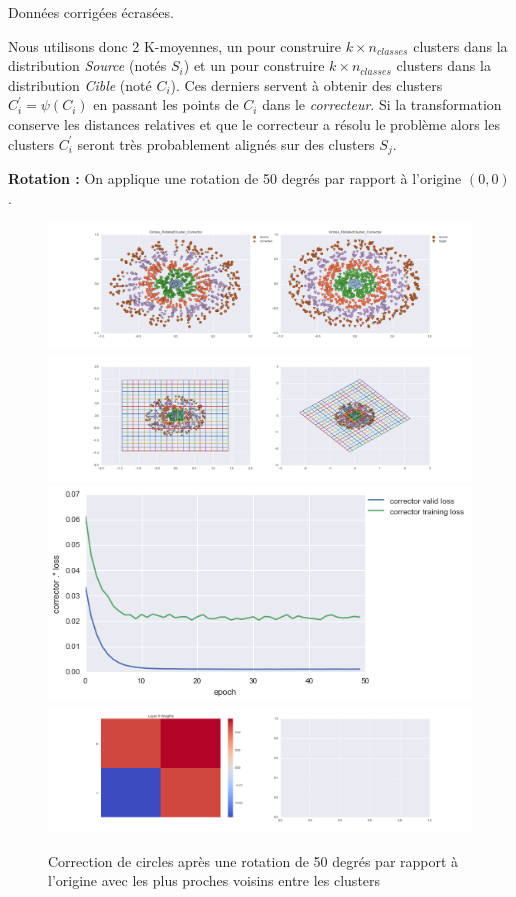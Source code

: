 Données corrigées écrasées.


Nous utilisons donc 2 K-moyennes, un pour construire $k\times n_{classes}$ clusters 
dans la distribution \emph{Source} (notés $S_i$) et un pour construire $k\times n_{classes}$ 
clusters dans la distribution \emph{Cible} (noté $C_i$). Ces derniers servent à obtenir 
des clusters $C_i^\prime = \psi(C_i)$ en passant les points de $C_i$ dans le \emph{correcteur}.
Si la transformation conserve les distances relatives et que le correcteur a résolu le problème
alors les clusters $C_i^\prime$ seront très probablement alignés sur des clusters $S_j$.

{\Large \textbf{Rotation :}} On applique une rotation de 50 degrés par rapport à l'origine $(0,0)$.

\begin{figure}[H] %
\centering
\includegraphics[width=\linewidth]{fig/24-05-2016/circles/Circles_RotatedCluster_Corrector-DATA.png}
\includegraphics[width=\linewidth]{fig/24-05-2016/circles/Circles_RotatedCluster_Corrector-GridCheck.png}
\includegraphics[width=0.45\linewidth]{fig/24-05-2016/circles/Circles_RotatedCluster_Corrector-Learning_curve.png}
\includegraphics[width=\linewidth]{fig/24-05-2016/circles/Circles_RotatedCluster_Corrector-W.png}
\caption{Correction de circles après une rotation de 50 degrés par rapport à l'origine avec les plus proches voisins entre les clusters}
\label{fig:recap-circles-rot-cluster}
\end{figure}

